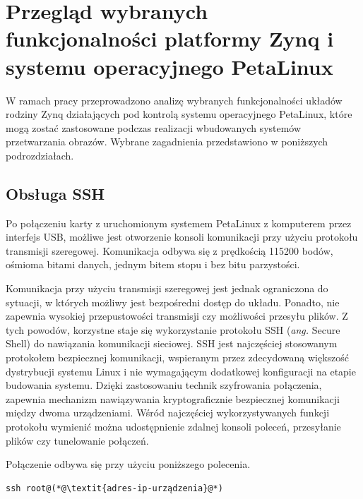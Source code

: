 \chapter{Przegląd wybranych funkcjonalności platformy Zynq i systemu operacyjnego PetaLinux}
\label{cha:functionalities}

W ramach pracy przeprowadzono analizę wybranych funkcjonalności układów rodziny Zynq działających pod kontrolą systemu operacyjnego PetaLinux, które mogą zostać zastosowane podczas realizacji wbudowanych systemów przetwarzania obrazów. 
Wybrane zagadnienia przedstawiono w poniższych podrozdziałach.

\section{Obsługa SSH}
\label{sec:ssh}

Po połączeniu karty z uruchomionym systemem PetaLinux z komputerem przez interfejs USB, możliwe jest otworzenie konsoli komunikacji przy użyciu protokołu transmisji szeregowej.
Komunikacja odbywa się z prędkością 115200 bodów, ośmioma bitami danych, jednym bitem stopu i bez bitu parzystości. %

Komunikacja przy użyciu transmisji szeregowej jest jednak ograniczona do sytuacji, w których możliwy jest bezpośredni dostęp do układu. 
Ponadto, nie zapewnia wysokiej przepustowości transmisji czy możliwości przesyłu plików. 
Z tych powodów, korzystne staje się wykorzystanie protokołu SSH (\emph{ang.} Secure Shell) do nawiązania komunikacji sieciowej. %
SSH jest najczęściej stosowanym protokołem bezpiecznej komunikacji, wspieranym przez zdecydowaną większość dystrybucji systemu Linux i nie wymagającym dodatkowej konfiguracji na etapie budowania systemu. Dzięki zastosowaniu technik szyfrowania połączenia, zapewnia mechanizm nawiązywania kryptograficznie bezpiecznej komunikacji między dwoma urządzeniami. Wśród najczęściej wykorzystywanych funkcji protokołu wymienić można udostępnienie zdalnej konsoli poleceń, przesyłanie plików czy tunelowanie połączeń.

Połączenie odbywa się przy użyciu poniższego polecenia.

\begin{lstlisting}[breaklines=true]
ssh root@(*@\textit{adres-ip-urządzenia}@*) 
\end{lstlisting} %

